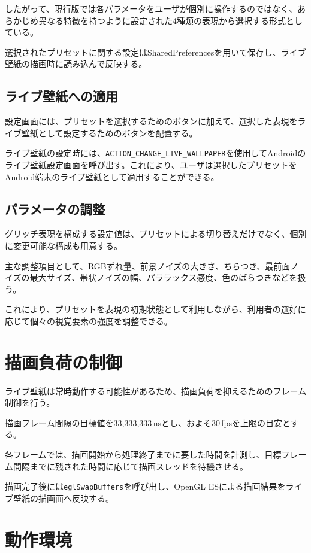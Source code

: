 したがって、現行版では各パラメータをユーザが個別に操作するのではなく、あらかじめ異なる特徴を持つように設定された4種類の表現から選択する形式としている。

選択されたプリセットに関する設定はSharedPreferencesを用いて保存し、ライブ壁紙の描画時に読み込んで反映する。

\subsection{ライブ壁紙への適用}

設定画面には、プリセットを選択するためのボタンに加えて、選択した表現をライブ壁紙として設定するためのボタンを配置する。

ライブ壁紙の設定時には、\texttt{ACTION\_CHANGE\_LIVE\_WALLPAPER}を使用してAndroidのライブ壁紙設定画面を呼び出す。これにより、ユーザは選択したプリセットをAndroid端末のライブ壁紙として適用することができる。


\subsection{パラメータの調整}

グリッチ表現を構成する設定値は、プリセットによる切り替えだけでなく、個別に変更可能な構成も用意する。

主な調整項目として、RGBずれ量、前景ノイズの大きさ、ちらつき、最前面ノイズの最大サイズ、帯状ノイズの幅、パララックス感度、色のばらつきなどを扱う。

これにより、プリセットを表現の初期状態として利用しながら、利用者の選好に応じて個々の視覚要素の強度を調整できる。




\section{描画負荷の制御}

ライブ壁紙は常時動作する可能性があるため、描画負荷を抑えるためのフレーム制御を行う。

描画フレーム間隔の目標値を33,333,333\,nsとし、およそ30\,fpsを上限の目安とする。

各フレームでは、描画開始から処理終了までに要した時間を計測し、目標フレーム間隔までに残された時間に応じて描画スレッドを待機させる。

描画完了後には\texttt{eglSwapBuffers}を呼び出し、OpenGL ESによる描画結果をライブ壁紙の描画面へ反映する。


\section{動作環境}


